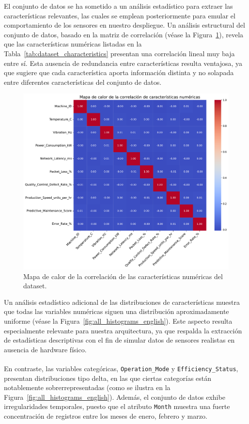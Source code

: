 El conjunto de datos se ha sometido a un análisis estadístico para extraer las características relevantes, las cuales se emplean posteriormente para emular el comportamiento de los sensores en nuestro despliegue. Un análisis estructural del conjunto de datos, basado en la matriz de correlación (véase la Figura~\ref{fig:variables_correlation}), revela que las características numéricas listadas en la Tabla~\ref{tab:dataset_characteristics} presentan una correlación lineal muy baja entre sí. Esta ausencia de redundancia entre características resulta ventajosa, ya que sugiere que cada característica aporta información distinta y no solapada entre diferentes características del conjunto de datos.

\begin{figure}[ht!]
    \centering
    \includegraphics[width=\textwidth]{fig/08_datadriven/datadriven_02.pdf}
    \caption{Mapa de calor de la correlación de las características numéricas del dataset.}
    \label{fig:variables_correlation}
\end{figure}

Un análisis estadístico adicional de las distribuciones de características muestra que todas las variables numéricas siguen una distribución aproximadamente uniforme (véase la Figura~\ref{fig:all_histograms_english}). Este aspecto resulta especialmente relevante para nuestra arquitectura, ya que respalda la extracción de estadísticas descriptivas con el fin de simular datos de sensores realistas en ausencia de hardware físico. \\
\\
En contraste, las variables categóricas, \texttt{Operation\_Mode} y \texttt{Efficiency\_Status}, presentan distribuciones tipo delta, en las que ciertas categorías están notablemente sobrerrepresentadas (como se ilustra en la Figura~\ref{fig:all_histograms_english}). Además, el conjunto de datos exhibe irregularidades temporales, puesto que el atributo \texttt{Month} muestra una fuerte concentración de registros entre los meses de enero, febrero y marzo.


